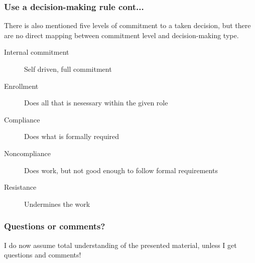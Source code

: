 \documentclass[screen]{beamer}
\begin{document}
\begin{frame}
    \frametitle{Use a decision-making rule cont...}

There is also mentioned five levels of commitment to a taken decision, but there are no direct mapping between commitment level and decision-making type.

\begin{description}
    \item[Internal commitment] Self driven, full commitment
    \item[Enrollment] Does all that is nesessary within the given role
    \item[Compliance] Does what is formally required
    \item[Noncompliance] Does work, but not good enough to follow formal requirements
    \item[Resistance] Undermines the work
\end{description}

\end{frame}
\begin{frame}
    \frametitle{Questions or comments?}

    I  do now assume total understanding of the presented material, unless I get questions and comments!

\end{frame}
\end{document}
